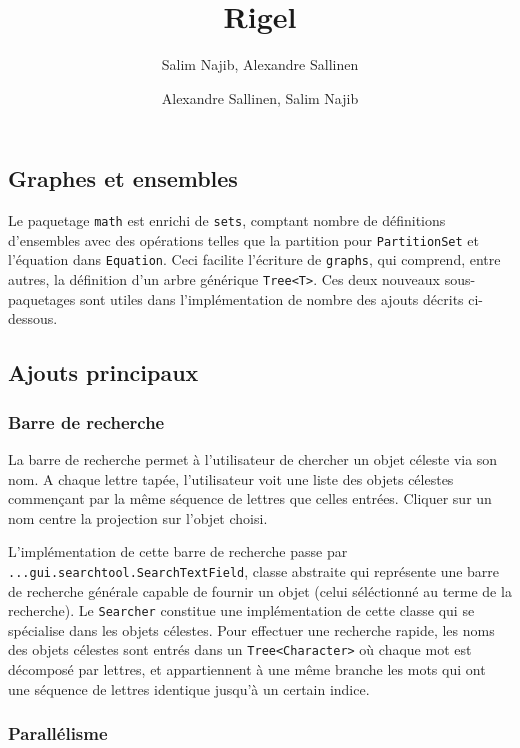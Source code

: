 \documentclass[10pt,a4paper]{report}
\author{Salim Najib, Alexandre Sallinen}
\title{Rigel}
\author{Alexandre Sallinen, Salim Najib}
\begin{document}
\newcommand{\code}[1]{\texttt{#1}}

\chapter*{}

\section*{Graphes et ensembles}

Le paquetage \code{math} est enrichi de \code{sets}, comptant nombre de définitions d'ensembles avec des opérations telles que la partition pour \code{PartitionSet} et l'équation dans \code{Equation}. Ceci facilite l'écriture de \code{graphs}, qui comprend, entre autres, la définition d'un arbre générique \code{Tree<T>}. Ces deux nouveaux sous-paquetages sont utiles dans l'implémentation de nombre des ajouts décrits ci-dessous.

\section*{Ajouts principaux}

\subsection*{Barre de recherche}

La barre de recherche permet à l'utilisateur de chercher un objet céleste via son nom. A chaque lettre tapée, l'utilisateur voit une liste des objets célestes commençant par la même séquence de lettres que celles entrées. Cliquer sur un nom centre la projection sur l'objet choisi.

L'implémentation de cette barre de recherche passe par \linebreak\code{...gui.searchtool.SearchTextField}, classe abstraite qui représente une barre de recherche générale capable de fournir un objet (celui séléctionné au terme de la recherche). Le \code{Searcher} constitue une implémentation de cette classe qui se spécialise dans les objets célestes. Pour effectuer une recherche rapide, les noms des objets célestes sont entrés dans un \code{Tree<Character>} où chaque mot est décomposé par lettres, et appartiennent à une même branche les mots qui ont une séquence de lettres identique jusqu'à un certain indice.

\subsection*{Parallélisme}
\end{document}
